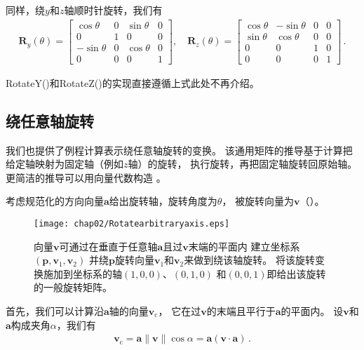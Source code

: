 同样，绕$y$和$z$轴顺时针旋转，我们有
\begin{align*}
    \bm R_y(\theta)=\left[
        \begin{array}{cccc}
            \cos\theta  & 0 & \sin\theta & 0 \\
            0           & 1 & 0          & 0 \\
            -\sin\theta & 0 & \cos\theta & 0 \\
            0           & 0 & 0          & 1
        \end{array}
        \right], \quad
    \bm R_z(\theta)=\left[
        \begin{array}{cccc}
            \cos\theta & -\sin\theta & 0 & 0 \\
            \sin\theta & \cos\theta  & 0 & 0 \\
            0          & 0           & 1 & 0 \\
            0          & 0           & 0 & 1
        \end{array}
        \right]\, .
\end{align*}

{\ttfamily RotateY()}和{\ttfamily RotateZ()}的实现直接遵循上式此处不再介绍。

\subsection{绕任意轴旋转}\label{sub:绕任意轴旋转}
我们也提供了例程计算表示绕任意轴旋转的变换。
该通用矩阵的推导基于计算把给定轴映射为固定轴（例如$z$轴）的旋转，
执行旋转，再把固定轴旋转回原始轴。
更简洁的推导可以用向量代数构造
。

考虑规范化的方向向量$\bm a$给出旋转轴，旋转角度为$\theta$，
被旋转向量为$\bm v$（）。
\begin{figure}[htbp]
    \centering\texttt{[image: chap02/Rotatearbitraryaxis.eps]}
    \caption{向量$\bm v$可通过在垂直于任意轴$\bm a$且过$\bm v$末端的平面内
        建立坐标系$(\bm p,\bm v_1,\bm v_2)$
        并绕$\bm p$旋转向量$\bm v_1$和$\bm v_2$来做到绕该轴旋转。
        将该旋转变换施加到坐标系的轴$(1,0,0)$、$(0,1,0)$
        和$(0,0,1)$即给出该旋转的一般旋转矩阵。}
    \label{fig:2.12}
\end{figure}

首先，我们可以计算沿$\bm a$轴的向量$\bm v_\mathrm{c}$，
它在过$\bm v$的末端且平行于$\bm a$的平面内。
设$\bm v$和$\bm a$构成夹角$\alpha$，我们有
\begin{align*}
    \bm v_\mathrm{c}=\bm a\|\bm v\|\cos\alpha=\bm a(\bm v\cdot\bm a)\, .
\end{align*}

